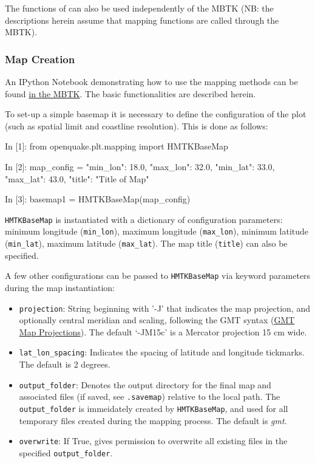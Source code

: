 The functions of  can also be used independently of the MBTK (NB: the descriptions herein assume that mapping functions are called through the MBTK). 

\subsubsection{Map Creation}
An IPython Notebook demonstrating how to use the mapping methods can be found \href{https://github.com/GEMScienceTools/oq-mbtk/tree/master/openquake/plt/demo}{in the MBTK}. The basic functionalities are described herein.

To set-up a simple basemap it is necessary to define the configuration of the plot (such as spatial limit and coastline resolution). This is done as follows:

\begin{python}[frame=single]
In [1]: from openquake.plt.mapping import HMTKBaseMap

In [2]: map_config = {"min_lon": 18.0,
                      "max_lon": 32.0,
                       "min_lat": 33.0,
                       "max_lat": 43.0,
		       "title": "Title of Map"}

In [3]: basemap1 = HMTKBaseMap(map_config)
\end{python}

\verb=HMTKBaseMap= is instantiated with a dictionary of configuration parameters: minimum longitude (\verb=min_lon=), maximum longitude (\verb=max_lon=), minimum latitude (\verb=min_lat=), maximum latitude (\verb=max_lat=). The map title (\verb=title=) can also be specified.

A few other configurations can be passed to \verb=HMTKBaseMap= via keyword parameters during the map instantiation:

\begin{itemize}
	\item \verb=projection=: String beginning with '-J' that indicates the map projection, and optionally central meridian and scaling, following the GMT syntax (\href{http://gmt.soest.hawaii.edu/doc/latest/gmt.html\#j-full}{GMT Map Projections}). The default `-JM15c' is a Mercator projection 15 cm wide.
\item \verb=lat_lon_spacing=: Indicates the spacing of latitude and longitude tickmarks. The default is 2 degrees.
\item \verb=output_folder=: Denotes the output directory for the final map and associated files (if saved, see \verb=.savemap=) relative to the local path. The \verb=output_folder= is immeidately created by \verb=HMTKBaseMap=, and used for all temporary files created during the mapping process. The default is \textit{gmt}. 
\item \verb=overwrite=: If True, gives permission to overwrite all existing files in the specified \verb=output_folder=.\\
\end{itemize}

